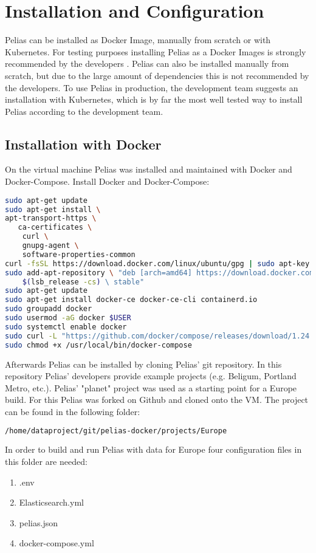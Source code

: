 \section{Installation and Configuration}
Pelias can be installed as Docker Image, manually from scratch or with Kubernetes. For testing purposes installing Pelias as a Docker Images is strongly recommended by the developers \cite{Simioni2018b}. Pelias can also be installed manually from scratch, but due to the large amount of dependencies this is not recommended by the developers. To use Pelias in production, the development team suggests an installation with Kubernetes, which is by far the most well tested way to install Pelias according to the development team.

\subsection{Installation with Docker}
On the virtual machine Pelias was installed and maintained with Docker and Docker-Compose. Install Docker and Docker-Compose:
\begin{lstlisting}[language=bash,breaklines=true]
sudo apt-get update
sudo apt-get install \
apt-transport-https \
   ca-certificates \
	curl \
	gnupg-agent \
	software-properties-common
curl -fsSL https://download.docker.com/linux/ubuntu/gpg | sudo apt-key add -
sudo add-apt-repository \ "deb [arch=amd64] https://download.docker.com/linux/ubuntu \
	$(lsb_release -cs) \ stable"
sudo apt-get update
sudo apt-get install docker-ce docker-ce-cli containerd.io
sudo groupadd docker
sudo usermod -aG docker $USER
sudo systemctl enable docker
sudo curl -L "https://github.com/docker/compose/releases/download/1.24.0/docker-compose-$(uname -s)-$(uname -m)" -o /usr/local/bin/docker-compose
sudo chmod +x /usr/local/bin/docker-compose
\end{lstlisting}
Afterwards Pelias can be installed by cloning Pelias' git repository. In this repository Pelias' developers provide example projects (e.g. Beligum, Portland Metro, etc.). Pelias' "planet" project was used as a starting point for a Europe build. For this Pelias was forked on Github and cloned onto the VM. The project can be found in the following folder:
\begin{lstlisting}[language=bash,breaklines=true]
/home/dataproject/git/pelias-docker/projects/Europe
\end{lstlisting}
In order to build and run Pelias with data for Europe four configuration files in this folder are needed:
\begin{enumerate}
\item .env
\item Elasticsearch.yml
\item pelias.json
\item docker-compose.yml
\end{enumerate}

